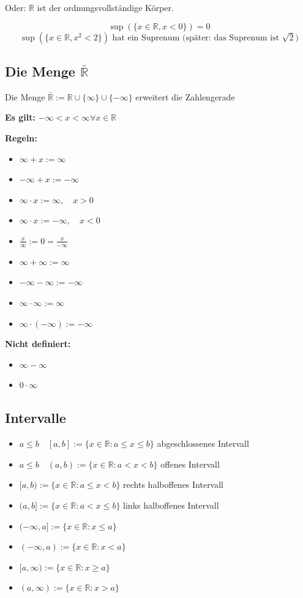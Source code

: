 \documentclass[fleqn]{scrbook}
\newcommand{\R}{\mathbb{R}}
\newenvironment{example}{{\bfseries Beispiel }}{}
\begin{document}
Oder: $\R$ ist der ordnungsvollständige Körper.

\begin{example}
\[\sup(\{x \in \R, x < 0\}) = 0\]
\[\sup(\{x \in \R, x^2 < 2\}) \text{ hat ein Suprenum (später: das Suprenum ist } \sqrt{2} \text{)}\]
\end{example}

\subsection{Die Menge \texorpdfstring{$\bar{\R}$}{R}}


Die Menge $\bar{\R}:= \R \cup \{\infty\} \cup \{-\infty\}$ erweitert die Zahlengerade

\textbf{Es gilt:} $-\infty < x < \infty \forall x \in \R$

\textbf{Regeln:}

\begin{itemize}
  \item $\infty + x := \infty$
  \item $-\infty + x := -\infty$
  \item $\infty  \cdot  x := \infty, \quad x>0$
  \item $\infty  \cdot  x := -\infty, \quad x<0$
  \item $\frac{x}{\infty}:=0=\frac{x}{-\infty}$
  \item $\infty + \infty := \infty$
  \item $-\infty - \infty := -\infty$
  \item $\infty  \cdot  \infty := \infty$
  \item $\infty  \cdot  (-\infty) := -\infty$
\end{itemize}

\textbf{Nicht definiert:}

\begin{itemize}
  \item $\infty-\infty$
  \item $0 \cdot \infty$
\end{itemize}

\subsection{Intervalle}

\begin{itemize}
  \item $a \leq b \quad [a,b] := \{x \in \R:a \leq x \leq b\}$ abgeschlossenes Intervall
  \item $a \leq b \quad (a,b) := \{x \in \R:a < x < b\}$ offenes Intervall
  \item $[a,b) := \{x \in \R:a \leq x < b\}$ rechts halboffenes Intervall
  \item $(a,b]:= \{x \in \R:a < x \leq b\}$ links halboffenes Intervall
  \item $(-\infty,a]:= \{x \in \R:x \leq a\}$
  \item $(-\infty,a):= \{x \in \R:x < a\}$
  \item $[a,\infty):= \{x \in \R:x \geq a\}$
  \item $(a,\infty):= \{x \in \R:x > a\}$
\end{itemize}
\end{document}
